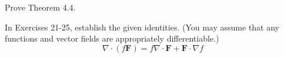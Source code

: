 \documentclass[12pt,letterpaper]{hmcpset}
\begin{document}
\begin{problem}[Colley 3.4.16]
    Prove Theorem 4.4.
\end{problem}
\begin{solution}
    \vfill
\end{solution}
\newpage

\begin{problem}[Colley 3.4.23]
    In Exercises 21-25, establish the given identities. (You may
    assume that any functions and vector fields are appropriately
    differentiable.)
    \[
        \nabla\cdot(f\textbf{F})=f\nabla\cdot\textbf{F}+\textbf{F}\cdot\nabla f
    \]
\end{problem}
\begin{solution}
    \vfill
\end{solution}
\end{document}
